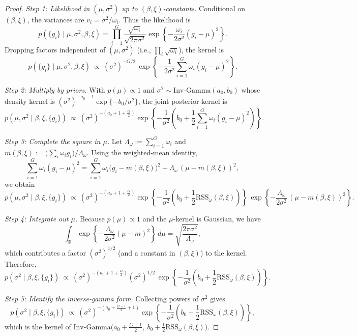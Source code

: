 \begin{proof}
\emph{Step 1: Likelihood in $(\mu,\sigma^2)$ up to $(\beta,\xi)$-constants.}
Conditional on $(\beta,\xi)$, the variances are $v_i=\sigma^2/\omega_i$.
Thus the likelihood is
\[
p(\{g_i\}\mid \mu,\sigma^2,\beta,\xi)
=\prod_{i=1}^G \frac{\sqrt{\omega_i}}{\sqrt{2\pi\sigma^2}}
\exp\!\left\{-\frac{\omega_i}{2\sigma^2}(g_i-\mu)^2\right\}.
\]
Dropping factors independent of $(\mu,\sigma^2)$ (i.e., $\prod_i \sqrt{\omega_i}$), the kernel is
\begin{equation}
p(\{g_i\}\mid \mu,\sigma^2,\beta,\xi)\ \propto\ 
(\sigma^2)^{-G/2}\,
\exp\!\left\{-\frac{1}{2\sigma^2}\sum_{i=1}^G \omega_i(g_i-\mu)^2\right\}.
\label{eq:lik-kernel}
\end{equation}

\emph{Step 2: Multiply by priors.}
With $p(\mu)\propto 1$ and $\sigma^2\sim\mathrm{Inv\text{-}Gamma}(a_0,b_0)$ whose density kernel is
$(\sigma^2)^{-a_0-1}\exp\{-b_0/\sigma^2\}$, the joint posterior kernel is
\[
p(\mu,\sigma^2\mid \beta,\xi,\{g_i\})
\ \propto\
(\sigma^2)^{-\left(a_0+1+\frac{G}{2}\right)}
\exp\!\left\{-\frac{1}{\sigma^2}\left(
b_0+\frac{1}{2}\sum_{i=1}^G \omega_i(g_i-\mu)^2
\right)\right\}.
\]

\emph{Step 3: Complete the square in $\mu$.}
Let $\Lambda_\omega:=\sum_{i=1}^G \omega_i$ and
$m(\beta,\xi):=\big(\sum_i \omega_i g_i\big)/\Lambda_\omega$.
Using the weighted-mean identity,
\[
\sum_{i=1}^G \omega_i(g_i-\mu)^2
=\sum_{i=1}^G \omega_i\big(g_i-m(\beta,\xi)\big)^2
+\Lambda_\omega\,(\mu-m(\beta,\xi))^2,
\]
we obtain
\[
p(\mu,\sigma^2\mid\beta,\xi,\{g_i\})
\ \propto\
(\sigma^2)^{-\left(a_0+1+\frac{G}{2}\right)}
\exp\!\left\{-\frac{1}{\sigma^2}\left(
b_0+\frac{1}{2}\mathrm{RSS}_\omega(\beta,\xi)
\right)\right\}\,
\exp\!\left\{-\frac{\Lambda_\omega}{2\sigma^2}\,(\mu-m(\beta,\xi))^2\right\}.
\]

\emph{Step 4: Integrate out $\mu$.}
Because $p(\mu)\propto 1$ and the $\mu$-kernel is Gaussian, we have
\[
\int_{\mathbb{R}}
\exp\!\left\{-\frac{\Lambda_\omega}{2\sigma^2}(\mu-m)^2\right\}\,d\mu
=\sqrt{\frac{2\pi\sigma^2}{\Lambda_\omega}},
\]
which contributes a factor $(\sigma^2)^{1/2}$ (and a constant in $(\beta,\xi)$) to the kernel.
Therefore,
\[
p(\sigma^2\mid \beta,\xi,\{g_i\})
\ \propto\
(\sigma^2)^{-\left(a_0+1+\frac{G}{2}\right)}(\sigma^2)^{1/2}\,
\exp\!\left\{-\frac{1}{\sigma^2}\left(
b_0+\frac{1}{2}\mathrm{RSS}_\omega(\beta,\xi)
\right)\right\}.
\]

\emph{Step 5: Identify the inverse-gamma form.}
Collecting powers of $\sigma^2$ gives
\[
p(\sigma^2\mid \beta,\xi,\{g_i\})
\ \propto\
(\sigma^2)^{-\left(a_0+\frac{G-1}{2}+1\right)}
\exp\!\left\{-\frac{1}{\sigma^2}\left(
b_0+\frac{1}{2}\mathrm{RSS}_\omega(\beta,\xi)
\right)\right\},
\]
which is the kernel of
\(
\mathrm{Inv\text{-}Gamma}\!\big(a_0+\tfrac{G-1}{2},\ b_0+\tfrac{1}{2}\mathrm{RSS}_\omega(\beta,\xi)\big).
\)
\end{proof}

